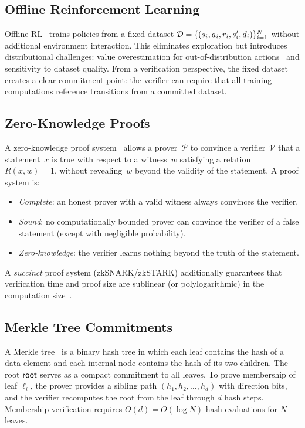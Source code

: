 \subsection{Offline Reinforcement Learning}

Offline RL~\cite{levine2020offline, fujimoto2019offpolicy} trains policies from
a fixed dataset $\mathcal{D} = \{(s_i, a_i, r_i, s'_i, d_i)\}_{i=1}^N$ without
additional environment interaction. This eliminates exploration but introduces
distributional challenges: value overestimation for out-of-distribution
actions~\cite{kumar2020cql} and sensitivity to dataset quality. From a
verification perspective, the fixed dataset creates a clear commitment point:
the verifier can require that all training computations reference transitions
from a committed dataset.

\subsection{Zero-Knowledge Proofs}\label{subsec:zkp}

A zero-knowledge proof system~\cite{thalerbook} allows a prover~$\mathcal{P}$
to convince a verifier~$\mathcal{V}$ that a statement~$x$ is true with respect
to a witness~$w$ satisfying a relation~$R(x,w) = 1$, without revealing~$w$
beyond the validity of the statement. A proof system is:
\begin{itemize}[leftmargin=1.5em]
  \item \emph{Complete}: an honest prover with a valid witness always
  convinces the verifier.
  \item \emph{Sound}: no computationally bounded prover can convince the
  verifier of a false statement (except with negligible probability).
  \item \emph{Zero-knowledge}: the verifier learns nothing beyond the truth
  of the statement.
\end{itemize}

\noindent A \emph{succinct} proof system (zkSNARK/zkSTARK) additionally
guarantees that verification time and proof size are sublinear (or polylogarithmic)
in the computation size~\cite{groth2016zksnark, bensasson2014scalable}.

\subsection{Merkle Tree Commitments}\label{subsec:merkle}

A Merkle tree~\cite{merkle1987} is a binary hash tree in which each leaf
contains the hash of a data element and each internal node contains the hash
of its two children. The root $\mathsf{root}$ serves as a compact commitment to all
leaves. To prove membership of leaf $\ell_i$, the prover provides a sibling
path $(h_1, h_2, \ldots, h_d)$ with direction bits, and the verifier
recomputes the root from the leaf through $d$ hash steps. Membership
verification requires $O(d) = O(\log N)$ hash evaluations for $N$ leaves.

